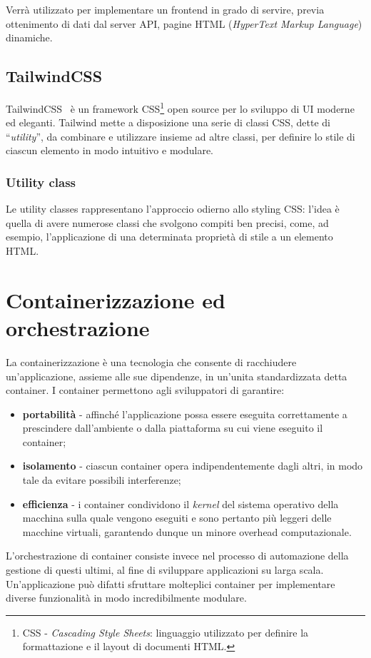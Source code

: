 Verrà utilizzato per implementare un frontend in grado di servire, previa ottenimento di dati dal server API, pagine HTML (\textit{HyperText Markup Language}) dinamiche.  
\subsection{TailwindCSS}
TailwindCSS~\cite{tailwindcss_docs} è un framework CSS\footnote{CSS - \textit{Cascading Style Sheets}: linguaggio utilizzato per definire la formattazione e il layout di documenti HTML.} open source per lo sviluppo di UI moderne ed eleganti. Tailwind mette a disposizione una serie di classi CSS, dette di ``\textit{utility}'', da combinare e utilizzare insieme ad altre classi, per definire lo stile di ciascun elemento in modo intuitivo e modulare.

\subsubsection{Utility class}

Le utility classes rappresentano l'approccio odierno allo styling CSS: l'idea è quella di avere numerose classi che svolgono compiti ben precisi, come, ad esempio, l'applicazione di una determinata proprietà di stile a un elemento HTML. 

\section{Containerizzazione ed orchestrazione}
La containerizzazione è una tecnologia che consente di racchiudere un'applicazione, assieme alle sue dipendenze, in un'unita standardizzata detta container. I container permettono agli sviluppatori di garantire:
\begin{itemize}
        \item \textbf{portabilità} - affinché l'applicazione possa essere eseguita correttamente a prescindere dall'ambiente o dalla piattaforma su cui viene eseguito il container;
        \item \textbf{isolamento} - ciascun container opera indipendentemente dagli altri, in modo tale da evitare possibili interferenze;
        \item \textbf{efficienza} - i container condividono il \textit{kernel} del sistema operativo della macchina sulla quale vengono eseguiti e sono pertanto più leggeri delle macchine virtuali, garantendo dunque un minore overhead computazionale.
\end{itemize}
L'orchestrazione di container consiste invece nel processo di automazione della gestione di questi ultimi, al fine di sviluppare applicazioni su larga scala. Un'applicazione può difatti sfruttare molteplici container per implementare diverse funzionalità in modo incredibilmente modulare.

